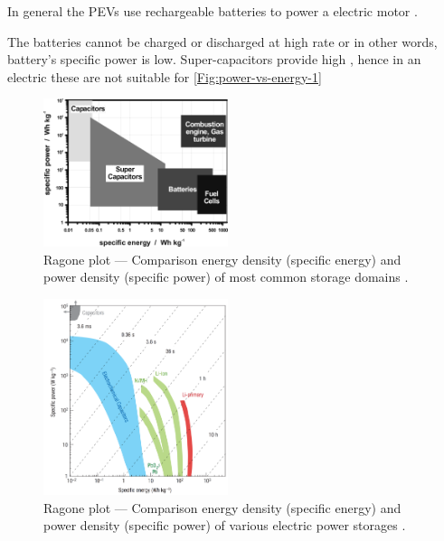 \documentclass[journal]{IEEEtran}
\begin{document}
In general the PEVs use rechargeable batteries to power a electric motor \cite{kutkut1999design}. 

The batteries cannot be charged or discharged at high rate or in other words, battery's specific power is low. Super-capacitors provide high , hence in an electric these are not suitable for  \autoref{Fig:power-vs-energy-1}

\begin{figure}
	\centering
	\includegraphics[width=0.48\textwidth]{specific-power-energy}
	\caption{Ragone plot --- Comparison energy density (specific energy) and power density (specific power) of most common storage domains \cite{winter2004batteries}.}
	\label{Fig:power-vs-energy-1}
\end{figure}

\begin{figure}
	\centering
	\includegraphics[width=0.48\textwidth]{power-vs-energy-density}
	\caption{Ragone plot --- Comparison energy density (specific energy) and power density (specific power) of various electric power storages \cite{simon2008materials}.}
	\label{Fig:power-vs-energy-2}
\end{figure}




\end{document}
